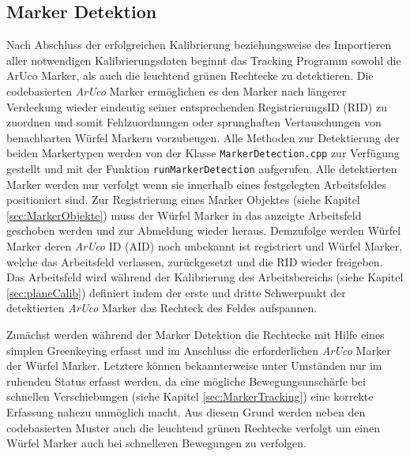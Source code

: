 \subsection{Marker Detektion}\label{sec:MarkerDetektion} 
Nach Abschluss der erfolgreichen Kalibrierung beziehungsweise des Importieren aller notwendigen Kalibrierungsdaten beginnt das Tracking Programm sowohl die ArUco Marker, als auch die leuchtend grünen Rechtecke zu detektieren. Die codebasierten \textit{ArUco} Marker ermöglichen es den Marker nach längerer Verdeckung wieder eindeutig seiner entsprechenden RegistrierungsID (RID) zu zuordnen und somit Fehlzuordnungen oder sprunghaften Vertauschungen von benachbarten Würfel Markern vorzubeugen. Alle Methoden zur Detektierung der beiden Markertypen werden von der Klasse \texttt{MarkerDetection.cpp} zur Verfügung gestellt und mit der Funktion \texttt{runMarkerDetection} aufgerufen. 
Alle detektierten Marker werden nur verfolgt wenn sie innerhalb eines festgelegten Arbeitsfeldes positioniert sind. Zur Registrierung eines Marker Objektes (siehe Kapitel \ref{sec:MarkerObjekte}) muss der Würfel Marker in das anzeigte Arbeitsfeld geschoben werden und zur Abmeldung wieder heraus. Demzufolge werden Würfel Marker deren \textit{ArUco} ID (AID) noch unbekannt ist registriert und Würfel Marker, welche das Arbeitsfeld verlassen, zurückgesetzt und die RID wieder freigeben. Das Arbeitsfeld wird während der Kalibrierung des Arbeitsbereichs (siehe Kapitel \ref{sec:planeCalib}) definiert indem der erste und dritte Schwerpunkt der detektierten \textit{ArUco} Marker das Rechteck des Feldes aufspannen.

Zunächst werden während der Marker Detektion die Rechtecke mit Hilfe eines simplen Greenkeying erfasst und im Anschluss die erforderlichen \textit{ArUco} Marker der Würfel Marker. Letztere können bekannterweise unter Umständen nur im ruhenden Status erfasst werden, da eine mögliche Bewegungsunschärfe bei schnellen Verschiebungen (siehe Kapitel \ref{sec:MarkerTracking}) eine korrekte Erfassung nahezu unmöglich macht. 
Aus diesem Grund werden neben den codebasierten Muster auch die leuchtend grünen Rechtecke verfolgt um einen Würfel Marker auch bei schnelleren Bewegungen zu verfolgen.
